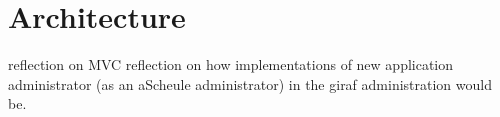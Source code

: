 \section{Architecture}
reflection on MVC
reflection on how implementations of new application administrator (as an aScheule administrator) in the giraf administration would be.